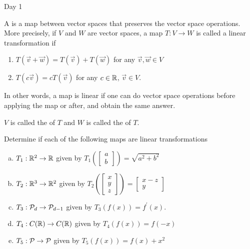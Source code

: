 
\begin{applicationActivities}{Day 1}

\begin{definition}
A  is a map between vector spaces that preserves the vector space operations.  More precisely, if $V$ and $W$ are vector spaces, a map $T:V\rightarrow W$ is called a linear transformation if
\begin{enumerate}
\item $T(\vec{v}+\vec{w}) = T(\vec{v})+T(\vec{w})$ for any $\vec{v},\vec{w} \in V$
\item $T(c\vec{v}) = cT(\vec{v})$ for any $c \in \IR$, $\vec{v} \in V$.
\end{enumerate}
In other words, a map is linear if one can do vector space operations before applying the map or after, and obtain the same answer.

$V$ is called the  of $T$ and $W$ is called the  of $T$.
\end{definition}

\begin{activity}
Determine if each of the following maps are linear transformations
\begin{enumerate}[(a)]
\item $T_1 : \IR^2 \rightarrow \IR$ given by $T_1\left(\begin{bmatrix} a \\ b \end{bmatrix} \right) = \sqrt{a^2+b^2}$
\item $T_2 : \IR^3 \rightarrow \IR^2$ given by $T_2\left(\begin{bmatrix} x \\ y \\ z \end{bmatrix} \right) = \begin{bmatrix} x-z \\ y \end{bmatrix}$
\item $T_3: \P_d \rightarrow \P_{d-1}$ given by $T_3(f(x)) = f^\prime(x)$.
\item $T_4: C(\IR) \rightarrow C(\IR)$ given by $T_4(f(x)) = f(-x)$
\item $T_5: \P \rightarrow \P$ given by $T_5(f(x)) = f(x)+x^2$
\end{enumerate}
\end{activity}


\end{applicationActivities}

